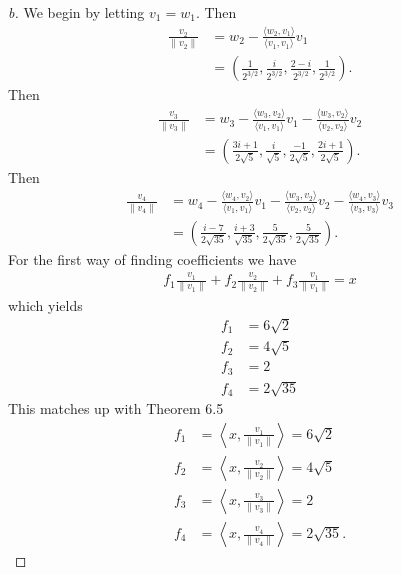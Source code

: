 \documentclass[leqno]{article}
\theoremstyle{nonumberplain}
\newtheorem{proof}{Proof}
\begin{document}
\begin{proof}[b]
We begin by letting $v_1=w_1$.  Then
\begin{align*}
\frac{v_2}{\|v_2\|} &= w_2 -\frac{\langle w_2,v_1 \rangle}{\langle v_1, v_1 \rangle} v_1\\
&= \left(\frac{1}{2^{3/2}},\frac{i}{2^{3/2}},\frac{2-i}{2^{3/2}},\frac{1}{2^{3/2}}\right).
\end{align*}
Then
\begin{align*}
\frac{v_3}{\|v_3\|} &= w_3 -\frac{\langle w_3 , v_2 \rangle}{\langle v_1, v_1\rangle} v_1 -\frac{\langle w_3, v_2 \rangle}{\langle v_2,v_2 \rangle} v_2\\
&= \left( \frac{3i+1}{2\sqrt{5}},\frac{i}{\sqrt{5}},\frac{-1}{2\sqrt{5}}, \frac{2i+1}{2\sqrt{5}} \right).
\end{align*}
Then
\begin{align*}
\frac{v_4}{\|v_4\|} &= w_4 -\frac{\langle w_4 , v_2 \rangle}{\langle v_1, v_1 \rangle} v_1 -\frac{\langle w_3, v_2 \rangle}{\langle v_2,v_2 \rangle} v_2 -\frac{ \langle w_4,v_3 \rangle}{\langle v_3,v_3 \rangle}v_3\\
&= \left( \frac{i-7}{2\sqrt{35}},\frac{i+3}{\sqrt{35}},\frac{5}{2\sqrt{35}}, \frac{5}{2\sqrt{35}} \right).
\end{align*}
For the first way of finding coefficients we have
\begin{align*}
f_1 \frac{v_1}{\|v_1\|} + f_2 \frac{v_2}{\|v_2\|} + f_3 \frac{v_1}{\|v_1\|} = x
\end{align*}
which yields 
\begin{align*}
f_1 &= 6\sqrt{2}\\
f_2 &= 4\sqrt{5}\\
f_3 &= 2\\
f_4 &= 2\sqrt{35}
\end{align*}
This matches up with Theorem 6.5
\begin{align*}
f_1 &= \left\langle x, \frac{v_1}{\|v_1\|} \right\rangle = 6\sqrt{2}\\
f_2 &= \left\langle x, \frac{v_2}{\|v_2\|} \right\rangle = 4\sqrt{5}\\
f_3 &= \left\langle x, \frac{v_3}{\|v_3\|} \right\rangle = 2\\
f_4 &= \left\langle x, \frac{v_4}{\|v_4\|} \right\rangle = 2\sqrt{35}.
\end{align*}
\end{proof}


\pagebreak


\end{document}

